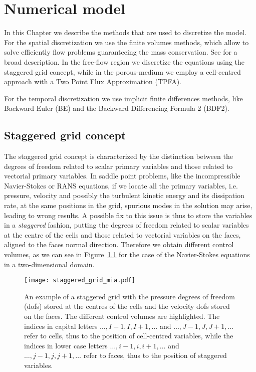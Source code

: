\chapter{Numerical model} \label{chap:discretization} %
In this Chapter we describe the methods that are used to discretize the model. 
For the spatial discretization we use the finite volumes methods, which allow 
to solve efficiently flow problems guaranteeing the mass conservation. See 
\cite{fv:leveque} for a broad description.
In the free-flow region we discretize the equations using the staggered grid 
concept, while in the porous-medium we employ a cell-centred approach with a 
Two Point Flux Approximation (TPFA).

For the temporal discretization we use implicit finite differences methods, 
like Backward Euler (BE) and the Backward Differencing Formula 2 (BDF2).
%
\section{Staggered grid concept}
The staggered grid concept is characterized by the distinction between the 
degrees of freedom related to scalar primary variables and those related to 
vectorial primary variables. In saddle point problems, like the incompressible 
Navier-Stokes or RANS equations, if we locate all the primary variables, i.e. 
pressure, velocity and possibly the turbulent kinetic energy and its 
dissipation rate, at the same positions in the grid, spurious modes in the 
solution may arise, leading to wrong results. A possible fix to this issue 
is thus to store the variables in a \emph{staggered} fashion, putting 
the degrees of freedom related to scalar variables at the centre of the cells 
and those related to vectorial variables on the faces, aligned to the faces 
normal direction. Therefore we obtain different control volumes, as we can see 
in Figure~\ref{fig:staggrid} for the case of the 
Navier-Stokes equations in a two-dimensional domain.
\begin{figure}[t]
	\centering
	\texttt{[image: staggered\_grid\_mia.pdf]}
	\caption[Staggered grid control volumes]{An example of a staggered grid 
	with the pressure degrees of freedom (dofs) stored at the centres of the 
	cells and the velocity dofs stored on the faces. The different control 
	volumes are highlighted. The indices in capital letters 
	$\dots,I-1,I,I+1,\dots$ 
	and $\dots,J-1,J,J+1,\dots$ refer to cells, thus to the position of 
	cell-centred variables, while the indices in lower case letters 
	$\dots,i-1,i,i+1,\dots$ and $\dots,j-1,j,j+1,\dots$ refer to faces, thus to 
	the 
	position of staggered variables.}
	\label{fig:staggrid}
\end{figure}

